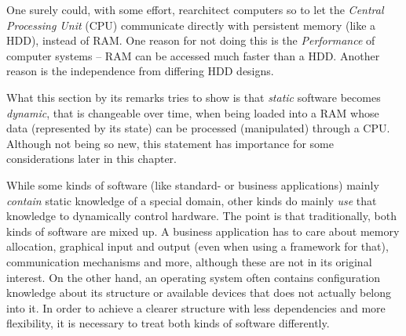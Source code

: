 One surely could, with some effort, rearchitect computers so to let the
\emph{Central Processing Unit} (CPU) communicate directly with persistent
memory (like a HDD), instead of RAM. One reason for not doing this is the
\emph{Performance} of computer systems -- RAM can be accessed much faster than a
HDD. Another reason is the independence from differing HDD designs.

What this section by its remarks tries to show is that \emph{static} software
becomes \emph{dynamic}, that is changeable over time, when being loaded into a
RAM whose data (represented by its state) can be processed (manipulated)
through a CPU. Although not being so new, this statement has importance for
some considerations later in this chapter.

While some kinds of software (like standard- or business applications) mainly
\emph{contain} static knowledge of a special domain, other kinds do mainly
\emph{use} that knowledge to dynamically control hardware. The point is that
traditionally, both kinds of software are mixed up. A business application has
to care about memory allocation, graphical input and output (even when using a
framework for that), communication mechanisms and more, although these are not
in its original interest. On the other hand, an operating system often contains
configuration knowledge about its structure or available devices that does not
actually belong into it. In order to achieve a clearer structure with less
dependencies and more flexibility, it is necessary to treat both kinds of
software differently.
